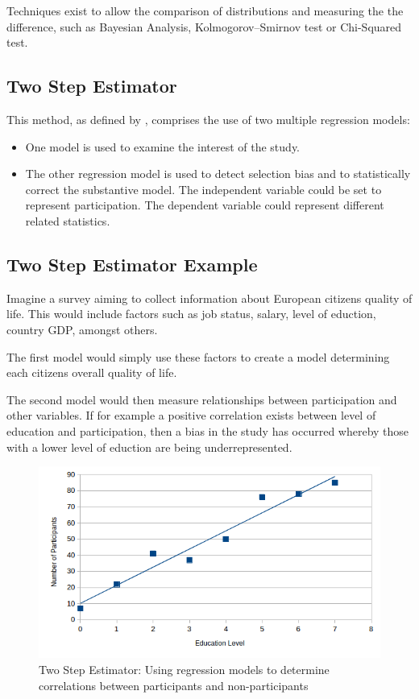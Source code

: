 Techniques exist to allow the comparison of distributions and measuring the the difference, such as Bayesian Analysis, Kolmogorov--Smirnov test or Chi-Squared test. \citep{GriffinEtAl2013}

	\subsection{Two Step Estimator}
	
	This method, as defined by \citet{Heckman1979}, comprises the use of two multiple regression models:
	
	\begin{itemize}
		\item One model is used to examine the interest of the study.
		\item The other regression model is used to detect selection bias and to statistically correct the substantive model. The independent variable could be set to represent participation. The  dependent variable could represent different related statistics.
	\end{itemize}
	
	\subsection{Two Step Estimator Example}
	
	Imagine a survey aiming to collect information about European citizens quality of life. This would include factors such as job status, salary, level of eduction, country GDP, amongst others.
	
The first model would simply use these factors to create a model determining each citizens overall quality of life.

The second model would then measure relationships between participation and other variables. If for example a positive correlation exists between level of education and participation, then a bias in the study has occurred whereby those with a lower level of eduction are being underrepresented.

	\begin{figure}[hbt!]
	\centering
  		\includegraphics[width=0.88\linewidth]{graphics/sample_selection_bias/Education_Correlation_Graph.png}
  		\caption{Two Step Estimator: Using regression models to determine correlations between participants and non-participants}
  		\label{fig:correlation}
	\end{figure}
	
